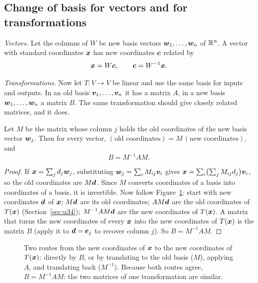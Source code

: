 \subsection{Change of basis for vectors and for transformations}

\emph{Vectors.} Let the columns of $W$ be new basis vectors $\boldsymbol{w}_1,\dots,\boldsymbol{w}_n$ of $\mathbb{R}^n$. A vector with
standard coordinates $\boldsymbol{x}$ has new coordinates $\boldsymbol{c}$ related by
\[
  \boldsymbol{x}=W\boldsymbol{c},\qquad \boldsymbol{c}=W^{-1}\boldsymbol{x}.
\]

\emph{Transformations.} Now let $T\colon V\to V$ be linear and use the same basis for inputs and
outputs. In an old basis $\boldsymbol{v}_1,\dots,\boldsymbol{v}_n$ it has a matrix $A$, in a new basis $\boldsymbol{w}_1,\dots,\boldsymbol{w}_n$ a
matrix $B$. The same transformation should give closely related matrices, and it does.

\begin{theorem}\label{thm:u35-similar}
Let $M$ be the matrix whose column $j$ holds the old coordinates of the new basis vector $\boldsymbol{w}_j$.
Then for every vector, $(\text{old coordinates})=M\,(\text{new coordinates})$, and
\[
  B=M^{-1}AM .
\]
\end{theorem}
\begin{proof}
If $\boldsymbol{x}=\sum_jd_j\boldsymbol{w}_j$, substituting $\boldsymbol{w}_j=\sum_iM_{ij}\boldsymbol{v}_i$ gives
$\boldsymbol{x}=\sum_i\bigl(\sum_jM_{ij}d_j\bigr)\boldsymbol{v}_i$, so the old coordinates are $M\boldsymbol{d}$. Since $M$ converts
coordinates of a basis into coordinates of a basis, it is invertible. Now follow
Figure~\ref{fig:u35-diagram}: start with new coordinates $\boldsymbol{d}$ of $\boldsymbol{x}$; $M\boldsymbol{d}$ are its old coordinates;
$AM\boldsymbol{d}$ are the old coordinates of $T(\boldsymbol{x})$ (Section~\ref{sec:u34}); $M^{-1}AM\boldsymbol{d}$ are the new coordinates
of $T(\boldsymbol{x})$. A matrix that turns the new coordinates of every $\boldsymbol{x}$ into the new coordinates of
$T(\boldsymbol{x})$ is the matrix $B$ (apply it to $\boldsymbol{d}=\boldsymbol{e}_j$ to recover column $j$). So $B=M^{-1}AM$.
\end{proof}

\begin{figure}[ht]\centering
{}
\caption{Two routes from the new coordinates of $\boldsymbol{x}$ to the new coordinates of $T(\boldsymbol{x})$: directly by
$B$, or by translating to the old basis ($M$), applying $A$, and translating back ($M^{-1}$).
Because both routes agree, $B=M^{-1}AM$: the two matrices of one transformation are similar.}
\label{fig:u35-diagram}
\end{figure}

